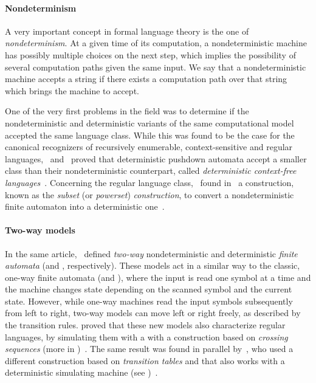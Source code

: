 \paragraph{Nondeterminism} A very important concept in formal language theory is the one of \emph{nondeterminism}.
At a given time of its computation, a nondeterministic machine has possibly multiple choices on the next step, which implies the possibility of several computation paths given the same input.
We say that a nondeterministic machine accepts a string if there exists a computation path over that string which brings the machine to accept.

One of the very first problems in the field was to determine if the nondeterministic and deterministic variants of the same computational model accepted the same language class.
While this was found to be the case for the canonical recognizers of recursively enumerable, context-sensitive and regular languages,~\citeauthor{Fis63} and~\citeauthor{Sch63} proved that deterministic pushdown automata accept a smaller class than their nondeterministic counterpart, called \emph{deterministic context-free languages}~\cite{Fis63,Sch63}.
Concerning the regular language class,~\citeauthor{RabSco59} found in~\citeyear{RabSco59} a construction, known as the \emph{subset} (or \emph{powerset}) \emph{construction}, to convert a nondeterministic finite automaton into a deterministic one~\cite{RabSco59}.

\paragraph{Two-way models} In the same article,~\citeauthor{RabSco59} defined \emph{two-way} nondeterministic and deterministic \emph{finite automata} (\TNFAs and \TDFAs, respectively).
These models act in a similar way to the classic, one-way finite automata (\ONFAs and \ODFAs), where the input is read one symbol at a time and the machine changes state depending on the scanned symbol and the current state. However, while one-way machines read the input symbols subsequently from left to right, two-way models can move left or right freely, as described by the transition rules.
\citeauthor{RabSco59} proved that these new models also characterize regular languages, by simulating them with a \ONFA with a construction based on \emph{crossing sequences} (more in )~\cite{RabSco59}.
The same result was found in parallel by~\citeauthor{She59}, who used a different construction based on \emph{transition tables} and that also works with a deterministic simulating machine (see )~\cite{She59}.




